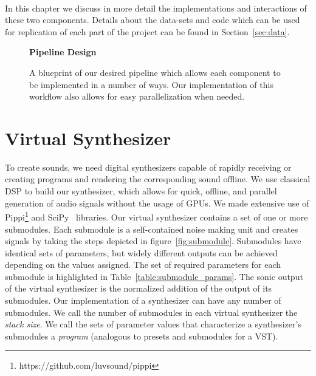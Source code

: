 \documentclass[\main/thesis.tex]{subfiles}
\begin{document}
\\
In this chapter we discuss in more detail the implementations and interactions of these two components. Details about the data-sets and code which can be used for replication of each part of the project can be found in Section~\ref{sec:data}.

 \begin{figure}[t!]
    \begin{center}
    \textbf{Pipeline Design}
    \end{center}
    \caption{A blueprint of our desired pipeline which allows each component to be implemented in a number of ways. Our implementation of this workflow also allows for easy parallelization when needed.
    }
\label{fig:pipeline_outline}
\end{figure}


\section{Virtual Synthesizer}
\label{vs}
 To create sounds, we need digital synthesizers capable of rapidly receiving or creating programs and rendering the corresponding sound offline. We use classical DSP to build our synthesizer, which allows for quick, offline, and parallel generation of audio signals without the usage of GPUs. We made extensive use of Pippi\footnote{https://github.com/luvsound/pippi} and SciPy~\cite{jones2001scipy} libraries. Our virtual synthesizer contains a set of one or more submodules. Each submodule is a self-contained noise making unit and creates signals by taking the steps depicted in figure~\ref{fig:submodule}. Submodules have identical sets of parameters, but widely different outputs can be achieved depending on the values assigned. The set of required parameters for each submodule is highlighted in Table~\ref{table:submodule_params}. The sonic output of the virtual synthesizer is the normalized addition of the output of its submodules. Our implementation of a synthesizer can have any number of submodules. We call the number of submodules in each virtual synthesizer the \textit{stack size}. We call the sets of parameter values that characterize a synthesizer's submodules a \textit{program} (analogous to presets and submodules for a VST).  
\end{document}
